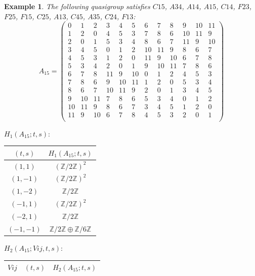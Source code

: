 \documentclass[11pt]{amsart}
\newtheorem{example}[theorem]{Example}
\theoremstyle{definition}
\newcommand{\Z}{\mathbb{Z}}
\begin{document}
\begin{example}
The following quasigroup satisfies 
$C15$, $A34$, $A14$, $A15$, $C14$, $F23$, $F25$, $F15$, $C25$, $A13$, $C45$, $A35$, $C24$, $F13$:
   \[ A_{15} = \left(
\begin{array}{cccccccccccc}
 0 & 1 & 2 & 3 & 4 & 5 & 6 & 7 & 8 & 9 & 10 & 11 \\
 1 & 2 & 0 & 4 & 5 & 3 & 7 & 8 & 6 & 10 & 11 & 9 \\
 2 & 0 & 1 & 5 & 3 & 4 & 8 & 6 & 7 & 11 & 9 & 10 \\
 3 & 4 & 5 & 0 & 1 & 2 & 10 & 11 & 9 & 8 & 6 & 7 \\
 4 & 5 & 3 & 1 & 2 & 0 & 11 & 9 & 10 & 6 & 7 & 8 \\
 5 & 3 & 4 & 2 & 0 & 1 & 9 & 10 & 11 & 7 & 8 & 6 \\
 6 & 7 & 8 & 11 & 9 & 10 & 0 & 1 & 2 & 4 & 5 & 3 \\
 7 & 8 & 6 & 9 & 10 & 11 & 1 & 2 & 0 & 5 & 3 & 4 \\
 8 & 6 & 7 & 10 & 11 & 9 & 2 & 0 & 1 & 3 & 4 & 5 \\
 9 & 10 & 11 & 7 & 8 & 6 & 5 & 3 & 4 & 0 & 1 & 2 \\
 10 & 11 & 9 & 8 & 6 & 7 & 3 & 4 & 5 & 1 & 2 & 0 \\
 11 & 9 & 10 & 6 & 7 & 8 & 4 & 5 & 3 & 2 & 0 & 1 \\
\end{array}
\right)\]


\bigskip


$H_1(A_{15};t,s):$

\begin{center}
    
\begin{tabular}{c|c}
    $(t,s)$ & $H_1(A_{15};t,s)$  \\
    \hline
    $(1,1)$ & $(\Z/2\Z)^2$ \\
    $(1,-1)$ & $(\Z/2\Z)^2$ \\
    $(1,-2)$ & $\Z/2\Z$ \\
    $(-1,1)$ & $(\Z/2\Z)^2$ \\
     $(-2,1)$ & $\Z/2\Z$ \\
     $(-1,-1)$ & $\Z/2\Z \oplus \Z/6\Z$
\end{tabular}
\end{center}
\bigskip

$H_2(A_{15};Vij,t,s):$

\begin{center}
    
\begin{tabular}{c|c|c}
    $Vij$ & $(t,s)$ & $H_2(A_{15};t,s)$  \\
    \hline


\end{tabular}
\end{center}
\end{example}
\end{document}
